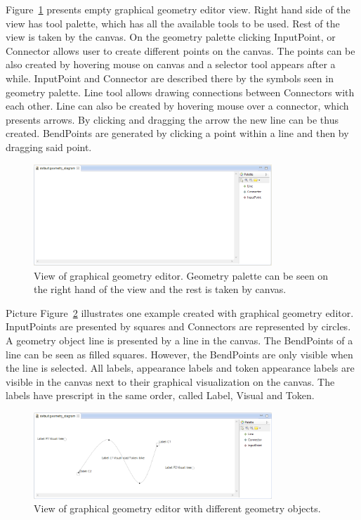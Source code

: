 Figure~\ref{fig:ge-diag-empty} presents empty graphical geometry editor view. Right hand side of the view has tool palette, which has all the available tools to be used. Rest of the view is taken by the canvas. On the geometry palette clicking InputPoint, or Connector allows user to create different points on the canvas. The points can be also created by hovering mouse on canvas and a selector tool appears after a while. InputPoint and Connector are described there by the symbols seen in geometry palette. Line tool allows drawing connections between Connectors with each other. Line can also be created by hovering mouse over a connector, which presents arrows. By clicking and dragging the arrow the new line can be thus created. BendPoints are generated by clicking a point within a line and then by dragging said point. 

\begin{figure}[htp]
\begin{center}
  \includegraphics[width=0.8\textwidth]{image/ge-diag-empty.png}
  \caption{View of graphical geometry editor. Geometry palette can be seen on the right hand of the view and the rest is taken by canvas.}
  \label{fig:ge-diag-empty}
\end{center}
\end{figure}

Picture Figure~\ref{fig:ge-diag-exam} illustrates one example created with graphical geometry editor. InputPoints are presented by squares and Connectors are represented by circles. A geometry object line is presented by a line in the canvas. The BendPoints of a line can be seen as filled squares. However, the BendPoints are only visible when the line is selected. All labels, appearance labels and token appearance labels are visible in the canvas next to their graphical visualization on the canvas. The labels have prescript in the same order, called Label, Visual and Token. 

\begin{figure}[htp]
\begin{center}
  \includegraphics[width=0.8\textwidth]{image/ge-diag-exam.png}
  \caption{View of graphical geometry editor with different geometry objects.}
  \label{fig:ge-diag-exam}
\end{center}
\end{figure}

